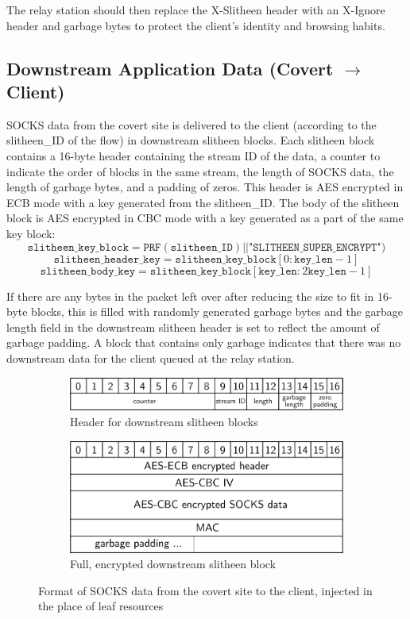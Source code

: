 \documentclass[11pt]{article}
\theoremstyle{definittion}
\begin{document}
The relay station should then replace the X-Slitheen header with an X-Ignore header and garbage bytes to protect the client's identity and browsing habits.

\subsection{Downstream Application Data (Covert $\rightarrow$ Client)}

SOCKS data from the covert site is delivered to the client (according to the slitheen\_ID of the flow) in downstream slitheen blocks. Each slitheen block contains a 16-byte header containing the stream ID of the data, a counter to indicate the order of blocks in the same stream, the length of SOCKS data, the length of garbage bytes, and a padding of zeros. This header is AES encrypted in ECB mode with a key generated from the slitheen\_ID. The body of the slitheen block is AES encrypted in CBC mode with a key generated as a part of the same key block:
$$\texttt{slitheen\_key\_block} = \texttt{PRF}(\texttt{slitheen\_ID}) || \texttt{"SLITHEEN\_SUPER\_ENCRYPT"})$$
$$\texttt{slitheen\_header\_key} = \texttt{slitheen\_key\_block}[0:\texttt{key\_len}-1] $$
$$\texttt{slitheen\_body\_key} = \texttt{slitheen\_key\_block}[\texttt{key\_len}:2\texttt{key\_len}-1] $$

If there are any bytes in the packet left over after reducing the size to fit in 16-byte blocks, this is filled with randomly generated garbage bytes and the garbage length field in the downstream slitheen header is set to reflect the amount of garbage padding.
A block that contains only garbage indicates that there was no downstream data for the client queued at the relay station.

\begin{figure}[h]
\begin{subfigure}{\textwidth}
\centering
\includegraphics[width=.75\textwidth]{downstream_slitheen_header}
\caption{Header for downstream slitheen blocks}
\end{subfigure}

\vspace{5mm}

\begin{subfigure}{\textwidth}
\centering
\includegraphics[width=.75\textwidth]{downstream_slitheen_block}
\caption{Full, encrypted downstream slitheen block}
\end{subfigure}
\caption{Format of SOCKS data from the covert site to the client, injected in the place of leaf resources}

\end{figure}
\end{document}
